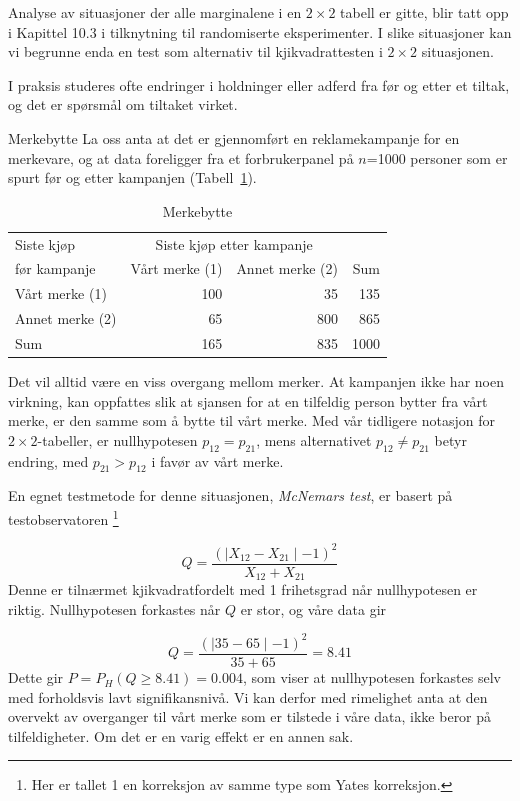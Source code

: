 Analyse av situasjoner der alle marginalene i en $2\times 2$ tabell er gitte,
blir tatt opp i Kapittel 10.3 i tilknytning til randomiserte eksperimenter.
I slike situasjoner kan vi begrunne enda en test som alternativ til
kjikvadrattesten i $2\times 2$ situasjonen.

I praksis studeres ofte endringer i holdninger eller adferd fra før
og etter et tiltak, og det er spørsmål om tiltaket virket.\\


\begin{eksempel}{Merkebytte}
La oss anta at det er gjennomført en reklamekampanje for en 
merkevare, og at data foreligger fra et forbrukerpanel på $n$=1000
personer som er spurt før og etter kampanjen (Tabell~\ref{tab:merkebytte}).

\begin{table} \centering 
\begin{tabular}{l|rr|r} 
Siste kjøp     &\multicolumn{2}{c|}{Siste kjøp etter kampanje}& \\  
før kampanje   &\multicolumn{1}{c}{Vårt merke (1)}&
                   \multicolumn{1}{c|}{Annet merke (2)} &  Sum  \\  \hline
Vårt merke (1)&        100          &       35         &  135  \\
Annet merke  (2)  &         65          &      800         &  865   \\ \hline
Sum               &        165          &      835         & 1000   \\ \hline
\end{tabular}
\caption{Merkebytte}
\label{tab:merkebytte} %
\end{table}
Det vil alltid være en viss overgang mellom merker.  At kampanjen ikke 
har noen virkning, kan oppfattes slik at sjansen for at en tilfeldig person
bytter fra vårt merke, er den samme som å bytte til vårt merke.
Med vår tidligere notasjon for $2\times 2$-tabeller, er 
nullhypotesen $p_{12} = p_{21}$, mens alternativet $p_{12} \neq p_{21}$
betyr endring, med $p_{21} > p_{12}$ i favør av vårt merke.

En egnet testmetode for denne situasjonen, {\em McNemars test}, er basert
på testobservatoren \footnote{Her er tallet 1 en korreksjon av
samme type som Yates korreksjon.}

\[ Q=\frac{{(\mid X_{12}-X_{21}\mid -1)}^2}{X_{12}+X_{21}}   \]
Denne er tilnærmet kjikvadratfordelt med 1 frihetsgrad når
nullhypotesen er riktig.  Nullhypotesen forkastes når $Q$ er 
stor, og våre data gir  

\[ Q=\frac{{(\mid 35-65\mid -1)}^2}{35+65}=8.41  \]
Dette gir $P=P_H(Q\geq 8.41) = 0.004$, som viser at nullhypotesen 
forkastes selv med forholdsvis lavt signifikansnivå.  Vi kan derfor
med rimelighet anta at den overvekt av overganger til vårt merke som er 
tilstede i våre data, ikke beror på tilfeldigheter. Om det 
er en varig effekt er en annen sak.
\end{eksempel}

